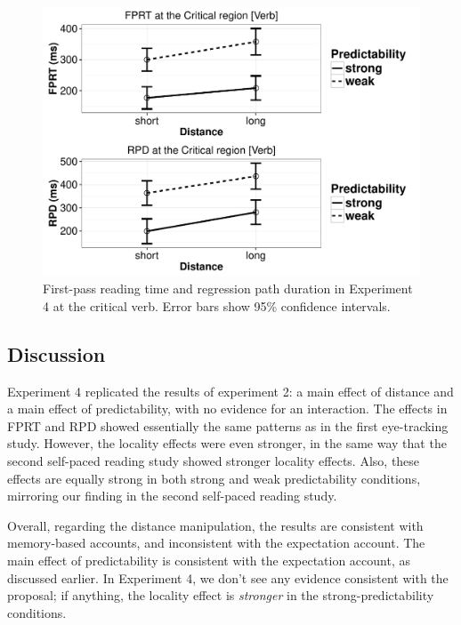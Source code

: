 \documentclass{frontiersSCNS}\usepackage{knitr} %
\begin{document}
\begin{figure}[!htbp]
\begin{center}
\begin{knitrout}
\color{fgcolor}

{\centering \includegraphics[width=\maxwidth]{Figures/SafaviEtAlfigureplotexp4-1} 

}



\end{knitrout}
\caption{First-pass reading time and regression path duration in Experiment 4 at the critical verb. Error bars show 95\% confidence intervals.}\label{fig:ET2plot}
\end{center}
\end{figure}

\subsection{Discussion}
Experiment 4 replicated the results of experiment 2: a main effect of distance and a main effect of predictability, with no evidence for an interaction. The effects in FPRT and RPD showed essentially the same patterns as in the first eye-tracking study. However, the locality effects were even stronger, in the same way that the second self-paced reading study showed stronger locality effects. Also, these effects are equally strong in both strong and weak predictability conditions, mirroring our finding in the second self-paced reading study. 

Overall, regarding the distance manipulation, the results are consistent with memory-based accounts, and inconsistent with the expectation account. The main effect of predictability is consistent with the expectation account, as discussed earlier.
In Experiment 4, we don't see any evidence consistent with the \citet{husain2014strong} proposal; if anything, the locality effect is \textit{stronger} in the strong-predictability conditions. 
\end{document}
